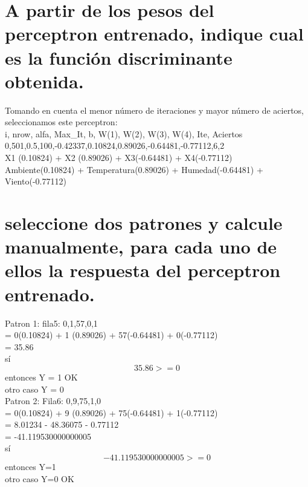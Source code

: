\documentclass[8.5pt,twoside,twocolumn]{article}
\begin{document}
    \section{A partir de los pesos del perceptron entrenado, indique cual es la funci\'on discriminante obtenida.}

        Tomando en cuenta el menor n\'umero de iteraciones y mayor n\'umero de aciertos, seleccionamos este perceptron:
        \\
        i, nrow, alfa, Max\_It, b, W(1), W(2), W(3), W(4), Ite, Aciertos
        \\
        0,501,0.5,100,-0.42337,0.10824,0.89026,-0.64481,-0.77112,6,2
        \\

        X1 (0.10824) + X2 (0.89026) + X3(-0.64481) + X4(-0.77112)
        \\
        Ambiente(0.10824)  + Temperatura(0.89026)  + Humedad(-0.64481) +  Viento(-0.77112)

    \section{seleccione dos patrones y calcule manualmente, para cada uno de ellos la respuesta del perceptron entrenado.}

	Patron 1: fila5: 0,1,57,0,1
        \\
	= 0(0.10824) + 1 (0.89026) + 57(-0.64481) + 0(-0.77112)
        \\
	= 35.86
        \\
	s\'i $$ 35.86 >= 0$$ entonces Y = 1 OK
        \\
	otro caso Y = 0
        \\
	Patron 2: Fila6: 0,9,75,1,0
        \\
	= 0(0.10824) + 9 (0.89026) + 75(-0.64481) + 1(-0.77112)
        \\
	= 8.01234 - 48.36075 - 0.77112
        \\
	= -41.119530000000005
        \\
	s\'i  $$ -41.119530000000005 >= 0$$ entonces Y=1
        \\
	otro caso Y=0 OK

\end{document}
